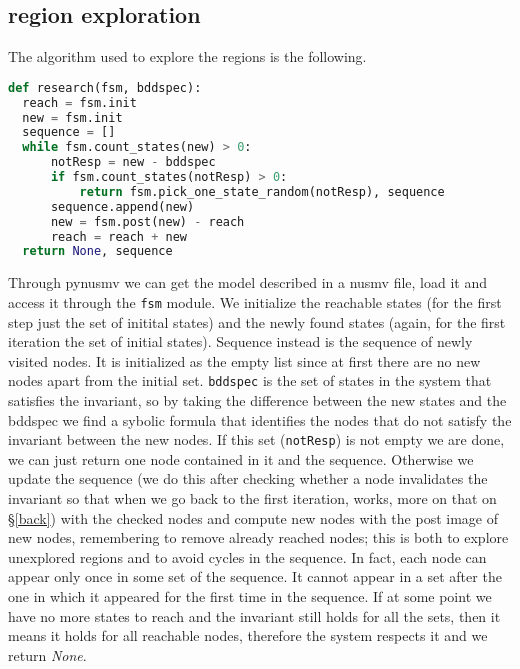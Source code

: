 \documentclass[9pt,oneside]{amsart}
\begin{document}
\begin{multicols}{2}
\section{region exploration}\label{explore}
The algorithm used to explore the regions is the following.
\begin{lstlisting}[language=Python]
def research(fsm, bddspec):
  reach = fsm.init
  new = fsm.init
  sequence = []
  while fsm.count_states(new) > 0:
      notResp = new - bddspec
      if fsm.count_states(notResp) > 0:
          return fsm.pick_one_state_random(notResp), sequence
      sequence.append(new)
      new = fsm.post(new) - reach
      reach = reach + new
  return None, sequence
\end{lstlisting}\label{code:reachable}
Through pynusmv we can get the model described in a nusmv file, load it
and access it through the \texttt{fsm} module. We initialize the
reachable states (for the first step just the set of initital states)
and the newly found states (again, for the first iteration the set of
initial states). Sequence instead is the sequence of newly visited
nodes. It is initialized as the empty list since at first there are no
new nodes apart from the initial set. \texttt{bddspec} is the set of
states in the system that satisfies the invariant, so by taking the
difference between the new states and the bddspec we find a sybolic
formula that identifies the nodes that do not satisfy the invariant
between the new nodes. If this set (\texttt{notResp}) is not empty we
are done, we can just return one node contained in it and the sequence.
Otherwise we update the sequence (we do this after checking
whether a node invalidates the invariant so that when we go back to the
first iteration, works, more on that on \S\ref{back}) with the checked
nodes and compute new nodes with the post image of new nodes,
remembering to remove already reached nodes; this is both to explore
unexplored regions and to avoid cycles in the sequence. In fact, each
node can appear only once in some set of the sequence. It cannot
appear in a set after the one in which it appeared for the first time
in the sequence. If at some point we have no more states to reach and
the invariant still holds for all the sets, then it means it holds for
all reachable nodes, therefore the system respects it and we return \textit{None}.


\end{multicols}
\end{document}
